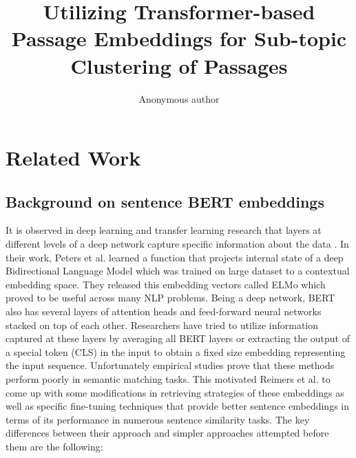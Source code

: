 \documentclass[sigconf,authordraft]{acmart}
\begin{document}
\title{Utilizing Transformer-based Passage Embeddings for Sub-topic Clustering of Passages}


\author{Anonymous author}

\renewcommand{\shortauthors}{}
\maketitle

\section{Related Work}
\subsection{Background on sentence BERT embeddings}
It is observed in deep learning and transfer learning research that layers at different levels of a deep network capture specific information about the data \cite{peters2018dissecting}. In their work, Peters et al. \cite{peters2018deep} learned a function that projects internal state of a deep Bidirectional Language Model which was trained on large dataset to a contextual embedding space. They released this embedding vectors called ELMo which proved to be useful across many NLP problems. Being a deep network, BERT \cite{devlin2018bert} also has several layers of attention heads and feed-forward neural networks stacked on top of each other. Researchers have tried to utilize information captured at these layers by averaging all BERT layers \cite{zhang2019bertscore} or extracting the output of a special token (CLS) in the input \cite{may2019measuring}\cite{qiao2019understanding} to obtain a fixed size embedding representing the input sequence. Unfortunately empirical studies prove that these methods perform poorly in semantic matching tasks. This motivated Reimers et al. \cite{reimers2019sentence} to come up with some modifications in retrieving strategies of these embeddings as well as specific fine-tuning techniques that provide better sentence embeddings in terms of its performance in numerous sentence similarity tasks. The key differences between their approach and simpler approaches attempted before them are the following:
\end{document}
